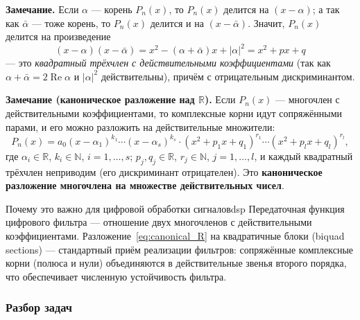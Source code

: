 \documentclass[12pt,a4paper]{article}
\begin{document}
\noindent\textbf{Замечание.} Если $\alpha$ — корень $P_n(x)$, то
$P_n(x)$ делится на $(x - \alpha)$; а так как $\bar\alpha$ — тоже
корень, то $P_n(x)$ делится и на $(x - \bar\alpha)$. Значит, $P_n(x)$
делится на произведение
\[
(x - \alpha)(x - \bar\alpha)
= x^2 - (\alpha + \bar\alpha) x + |\alpha|^2
= x^2 + p x + q
\]
— это \emph{квадратный трёхчлен с действительными коэффициентами}
(так как $\alpha + \bar\alpha = 2\operatorname{Re}\alpha$ и
$|\alpha|^2$ действительны), причём с отрицательным дискриминантом.

\noindent\textbf{Замечание (каноническое разложение над
$\mathbb{R}$).} Если $P_n(x)$ — многочлен с действительными
коэффициентами, то комплексные корни идут сопряжёнными парами, и его
можно разложить на действительные множители:
\begin{equation}
P_n(x) = a_0 (x - \alpha_1)^{k_1} \cdots (x - \alpha_s)^{k_s}
\cdot (x^2 + p_1 x + q_1)^{r_1} \cdots (x^2 + p_l x + q_l)^{r_l},
\label{eq:canonical_R}
\end{equation}
где $\alpha_i \in \mathbb{R}$, $k_i \in \mathbb{N}$, $i = 1, \dots, s$;
$p_j, q_j \in \mathbb{R}$, $r_j \in \mathbb{N}$, $j = 1, \dots, l$, и
каждый квадратный трёхчлен неприводим (его дискриминант отрицателен).
Это \textbf{каноническое разложение многочлена на множестве
действительных чисел}.

\begin{remarkIT}{Почему это важно для цифровой обработки сигналов}{dsp}
Передаточная функция цифрового фильтра — отношение двух многочленов
с действительными коэффициентами. Разложение~\eqref{eq:canonical_R}
на квадратичные блоки (biquad sections) — стандартный приём
реализации фильтров: сопряжённые комплексные корни (полюса и нули)
объединяются в действительные звенья второго порядка, что
обеспечивает численную устойчивость фильтра.
\end{remarkIT}

\subsubsection*{Разбор задач}
\end{document}
